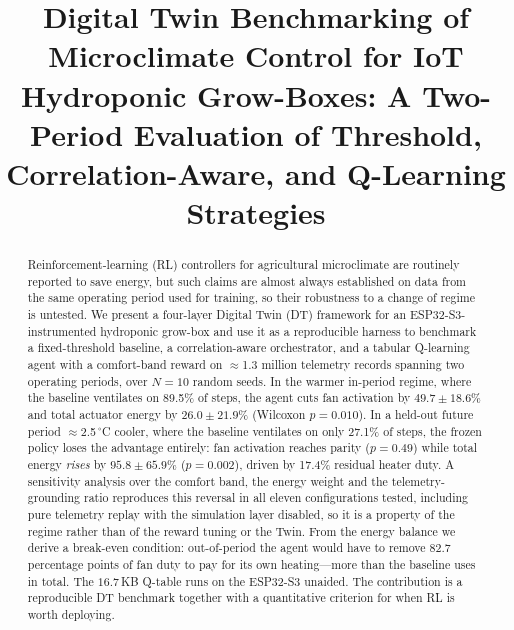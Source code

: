 \documentclass[conference]{IEEEtran}
\begin{document}
\title{Digital Twin Benchmarking of Microclimate Control for
IoT Hydroponic Grow-Boxes: A Two-Period Evaluation of Threshold,
Correlation-Aware, and Q-Learning Strategies}

\author{
}

\maketitle

\begin{abstract}
Reinforcement-learning (RL) controllers for agricultural microclimate are
routinely reported to save energy, but such claims are almost always established
on data from the same operating period used for training, so their robustness to
a change of regime is untested. We present a four-layer Digital Twin (DT)
framework for an ESP32-S3-instrumented hydroponic grow-box and use it as a
reproducible harness to benchmark a fixed-threshold baseline, a
correlation-aware orchestrator, and a tabular Q-learning agent with a
comfort-band reward on $\approx$1.3 million telemetry records spanning two
operating periods, over $N=10$ random seeds. In the warmer in-period regime,
where the baseline ventilates on 89.5\% of steps, the agent cuts fan activation
by $49.7\pm18.6\%$ and total actuator energy by $26.0\pm21.9\%$ (Wilcoxon
$p=0.010$). In a held-out future period $\approx$2.5\,$^{\circ}$C cooler, where
the baseline ventilates on only 27.1\% of steps, the frozen policy loses the
advantage entirely: fan activation reaches parity ($p=0.49$) while total energy
\emph{rises} by $95.8\pm65.9\%$ ($p=0.002$), driven by 17.4\% residual heater
duty. A sensitivity analysis over the comfort band, the energy weight and the
telemetry-grounding ratio reproduces this reversal in all eleven configurations
tested, including pure telemetry replay with the simulation layer disabled, so it
is a property of the regime rather than of the reward tuning or the Twin. From
the energy balance we derive a break-even condition: out-of-period the agent
would have to remove 82.7 percentage points of fan duty to pay for its own
heating---more than the baseline uses in total. The $16.7$\,KB Q-table runs on
the ESP32-S3 unaided. The contribution is a reproducible DT benchmark together
with a quantitative criterion for when RL is worth deploying.
\end{abstract}
\end{document}

